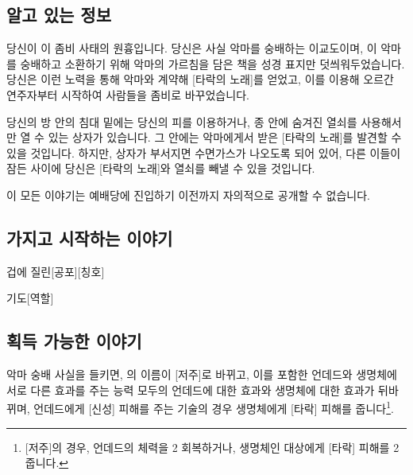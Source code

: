 \documentclass{report}
\begin{document}
	\subsection*{알고 있는 정보}
		당신이 이 좀비 사태의 원흉입니다. 당신은 사실 악마를 숭배하는 이교도이며, 이 악마를 숭배하고 소환하기 위해 악마의 가르침을 담은 책을 성경 표지만 덧씌워두었습니다. 당신은 이런 노력을 통해 악마와 계약해 [타락의 노래]를 얻었고, 이를 이용해 오르간 연주자부터 시작하여 사람들을 좀비로 바꾸었습니다.
		
		당신의 방 안의 침대 밑에는 당신의 피를 이용하거나, 종 안에 숨겨진 열쇠를 사용해서만 열 수 있는 상자가 있습니다. 그 안에는 악마에게서 받은 [타락의 노래]를 발견할 수 있을 것입니다. 하지만, 상자가 부서지면 수면가스가 나오도록 되어 있어, 다른 이들이 잠든 사이에 당신은 [타락의 노래]와 열쇠를 빼낼 수 있을 것입니다.
		
		이 모든 이야기는 예배당에 진입하기 이전까지 자의적으로 공개할 수 없습니다.
	
	\subsection*{가지고 시작하는 이야기}
		\begin{story}{겁에 질린}{[공포][칭호]}
			
			

		\end{story}
		
		\begin{story}{기도}{[역할]}
		\end{story}
	
	\subsection*{획득 가능한 이야기}
	악마 숭배 사실을 들키면, 의 이름이 [저주]로 바뀌고, 이를 포함한 언데드와 생명체에 서로 다른 효과를 주는 능력 모두의 언데드에 대한 효과와 생명체에 대한 효과가 뒤바뀌며, 언데드에게 [신성] 피해를 주는 기술의 경우 생명체에게 [타락] 피해를 줍니다\footnote{[저주]의 경우, 언데드의 체력을 2 회복하거나, 생명체인 대상에게 [타락] 피해를 2 줍니다.}.
	
\end{document}
